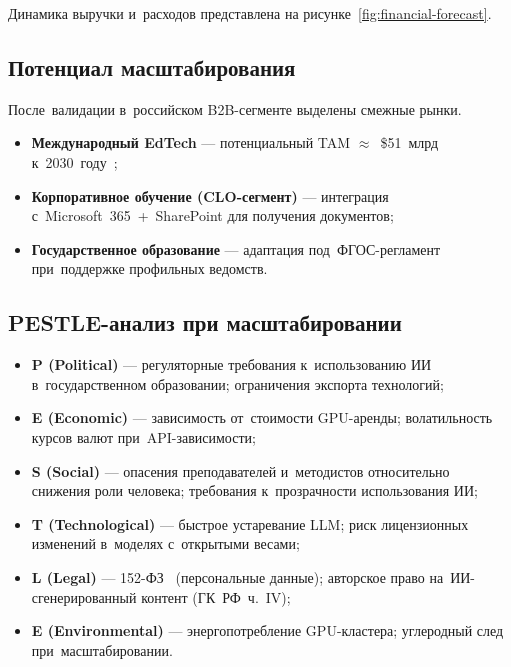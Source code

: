 Динамика выручки и~расходов представлена на рисунке~\ref{fig:financial-forecast}.



\subsection{Потенциал масштабирования}

После~валидации в~российском B2B-сегменте выделены
смежные рынки.

\begin{itemize}
  \item \textbf{Международный EdTech} — потенциальный TAM $\approx$~\$51~млрд
    к~2030~году~\cite{edtech_market_report_2024};
  \item \textbf{Корпоративное обучение (CLO-сегмент)} — интеграция
    с~Microsoft~365~+~SharePoint для получения документов;
  \item \textbf{Государственное образование} — адаптация под~ФГОС-регламент
    при~поддержке профильных ведомств.
\end{itemize}

\subsection{PESTLE-анализ при масштабировании}

\begin{itemize}
  \item \textbf{P (Political)} — регуляторные требования к~использованию
    ИИ в~государственном образовании; ограничения экспорта технологий;
  \item \textbf{E (Economic)} — зависимость от~стоимости GPU-аренды;
    волатильность курсов валют при~API-зависимости;
  \item \textbf{S (Social)} — опасения преподавателей и~методистов
    относительно снижения роли человека; требования к~прозрачности
    использования ИИ;
  \item \textbf{T (Technological)} — быстрое устаревание LLM;
    риск лицензионных изменений в~моделях с~открытыми весами;
  \item \textbf{L (Legal)} — 152-ФЗ~\cite{fz_152_2006} (персональные данные);
    авторское право на~ИИ-сгенерированный контент (ГК~РФ~ч.~IV);
  \item \textbf{E (Environmental)} — энергопотребление GPU-кластера;
    углеродный след при~масштабировании.
\end{itemize}

